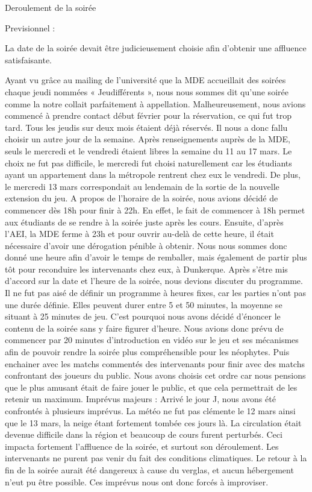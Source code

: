 ﻿ Deroulement de la soirée 

Previsionnel :

La date de la soirée devait être judicieusement choisie afin d'obtenir une affluence satisfaisante.

Ayant vu grâce au mailing de l’université que la MDE accueillait des soirées chaque jeudi 
nommées « Jeudifférents », nous nous sommes dit qu’une soirée comme la notre collait 
parfaitement à appellation. Malheureusement, nous avions commencé à prendre contact 
début février pour la réservation, ce qui fut trop tard. Tous les jeudis sur deux mois étaient 
déjà réservés.
Il nous a donc fallu choisir un autre jour de la semaine. Après renseignements auprès de la 
MDE, seuls le mercredi et le vendredi étaient libres la semaine du 11 au 17 mars. Le choix ne 
fut pas difficile, le mercredi fut choisi naturellement car les étudiants ayant un appartement 
dans la métropole rentrent chez eux le vendredi. De plus, le mercredi 13 mars correspondait 
au lendemain de la sortie de la nouvelle extension du jeu.
A propos de l’horaire de la soirée, nous avions décidé de commencer dès 18h pour finir à 
22h. En effet, le fait de commencer à 18h permet aux étudiants de se rendre à la soirée juste 
après les cours. Ensuite, d’après l’AEI, la MDE ferme à 23h et pour ouvrir au-delà de cette 
heure, il était nécessaire d’avoir une dérogation pénible à obtenir. Nous nous sommes donc 
donné une heure afin d’avoir le temps de remballer, mais également de partir plus tôt pour 
reconduire les intervenants chez eux, à Dunkerque.
Après s’être mis d’accord sur la date et l’heure de la soirée, nous devions discuter du 
programme.
Il ne fut pas aisé de définir un programme à heures fixes, car les parties n’ont pas une durée 
définie. Elles peuvent durer entre 5 et 50 minutes, la moyenne se situant à 25 minutes de jeu. 
C’est pourquoi nous avons décidé d’énoncer le contenu de la soirée sans y faire figurer 
d’heure.
Nous avions donc prévu de commencer par 20 minutes d’introduction en vidéo sur le jeu et 
ses mécanismes afin de pouvoir rendre la soirée plus compréhensible pour les néophytes. 
Puis enchainer avec les matchs commentés des intervenants pour finir avec des matchs 
confrontant des joueurs du public. Nous avons choisis cet ordre car nous pensions que le plus 
amusant était de faire jouer le public, et que cela permettrait de les retenir un maximum.
Imprévus majeurs :
Arrivé le jour J, nous avons été confrontés à plusieurs imprévus.
La météo ne fut pas clémente le 12 mars ainsi que le 13 mars, la neige étant fortement 
tombée ces jours là. La circulation était devenue difficile dans la région et beaucoup de cours 
furent perturbés.
Ceci impacta fortement l’affluence de la soirée, et surtout son déroulement. Les intervenants 
ne purent pas venir du fait des conditions climatiques. Le retour à la fin de la soirée aurait été 
dangereux à cause du verglas, et aucun hébergement n’eut pu être possible.
Ces imprévus nous ont donc forcés à improviser.

